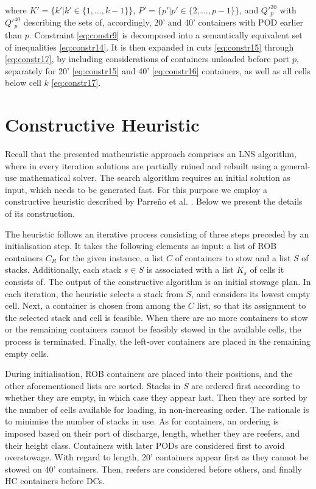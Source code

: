 \documentclass[preprint,12pt,3p]{elsarticle}
\begin{document}
where $K' = \{k'|k' \in \{1, \ldots, k-1\}\}$, $P' = \{p'|p' \in \{2, \ldots, p-1\}\}$, and $Q'^{20}_{p}$ with $Q'^{40}_{p}$ describing the sets of, accordingly, 20' and 40' containers with POD earlier than $p$. Constraint \eqref{eq:constr9} is decomposed into a semantically equivalent set of inequalities \eqref{eq:constr14}. It is then expanded in cuts \eqref{eq:constr15} through \eqref{eq:constr17}, by including considerations of containers unloaded before port $p$, separately for 20' \eqref{eq:constr15} and 40' \eqref{eq:constr16} containers, as well as all cells below cell $k$ \eqref{eq:constr17}. \cite{DJJRA12}

\section{Constructive Heuristic}
\label{sec:ConstHeuristic}
Recall that the presented matheuristic approach comprises an LNS algorithm, where in every iteration solutions are partially ruined and rebuilt using a general-use mathematical solver. The search algorithm requires an initial solution as input, which needs to be generated fast. For this purpose we employ a constructive heuristic described by Parre\~{n}o et al. \cite{PPAV16}. Below we present the details of its construction.

The heuristic follows an iterative process consisting of three steps preceded by an initialisation step. It takes the following elements as input: a list of ROB containers $C_R$ for the given instance, a list $C$ of containers to stow and a list $S$ of stacks. Additionally, each stack $s \in S$ is associated with a list $K_s$ of cells it consists of. The output of the constructive algorithm is an initial stowage plan. In each iteration, the heuristic selects a stack from $S$, and considers its lowest empty cell. Next, a container is chosen from among the $C$ list, so that its assignment to the selected stack and cell is feasible. When there are no more containers to stow or the remaining containers cannot be feasibly stowed in the available cells, the process is terminated. Finally, the left-over containers are placed in the remaining empty cells. \cite{PPAV16}

During initialisation, ROB containers are placed into their positions, and the other aforementioned lists are sorted. Stacks in $S$ are ordered first according to whether they are empty, in which case they appear last. Then they are sorted by the number of cells available for loading, in non-increasing order. The rationale is to minimise the number of stacks in use. As for containers, an ordering is imposed based on their port of discharge, length, whether they are reefers, and their height class. Containers with later PODs are considered first to avoid overstowage. With regard to length, 20' containers appear first as they cannot be stowed on 40' containers. Then, reefers are considered before others, and finally HC containers before DCs. \cite{PPAV16}   
\end{document}
